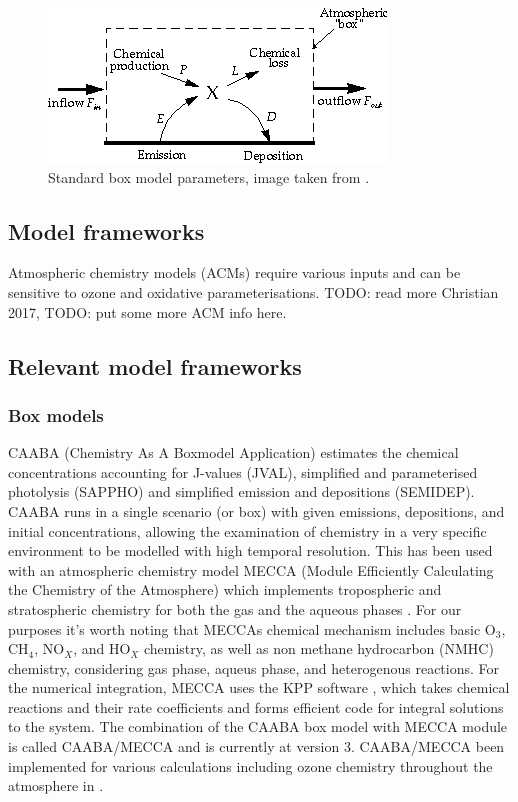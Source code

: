     \begin{figure}
      \includegraphics{Figures/boxmodel.png}
      \caption{ Standard box model parameters, image taken from \citet{Jacob_1999_book}. }
      \label{ch_LitRev:fig:boxmodel}
    \end{figure}
    
  \subsection{Model frameworks}
    
    Atmospheric chemistry models (ACMs) require various inputs and can be sensitive to ozone and oxidative parameterisations. 
    TODO: read more Christian 2017,
    TODO: put some more ACM info here.
    
  \subsection{Relevant model frameworks}
    \subsubsection{Box models} %
      
      CAABA (Chemistry As A Boxmodel Application) estimates the chemical concentrations accounting for J-values (JVAL), simplified and parameterised photolysis (SAPPHO) and simplified emission and depositions (SEMIDEP).
      CAABA runs in a single scenario (or box) with given emissions, depositions, and initial concentrations, allowing the examination of chemistry in a very specific environment to be modelled with high temporal resolution.
      This has been used with an atmospheric chemistry model MECCA (Module Efficiently Calculating the Chemistry of the Atmosphere) which implements tropospheric and stratospheric chemistry for both the gas and the aqueous phases \citep{Sander2005}.
      For our purposes it's worth noting that MECCAs chemical mechanism includes basic O$_3$, CH$_4$, NO$_X$, and HO$_X$ chemistry, as well as non methane hydrocarbon (NMHC) chemistry, considering gas phase, aqueus phase, and heterogenous reactions. \citep{Sander2005}
      For the numerical integration, MECCA uses the KPP software \citep{SanduSander2006}, which takes chemical reactions and their rate coefficients and forms efficient code for integral solutions to the system.
      The combination of the CAABA box model with MECCA module is called CAABA/MECCA and is currently at version 3.
      CAABA/MECCA been implemented for various calculations including ozone chemistry throughout the atmosphere in \cite{Zanis2014}.
  
